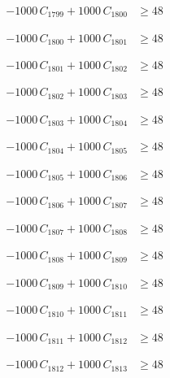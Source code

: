 \documentclass[a4paper,11pt]{article}
\begin{document}
\begin{align}
-1000\,C_{1799} + 1000\,C_{1800} &\geq 48 \nonumber
\end{align}

\begin{align}
-1000\,C_{1800} + 1000\,C_{1801} &\geq 48 \nonumber
\end{align}

\begin{align}
-1000\,C_{1801} + 1000\,C_{1802} &\geq 48 \nonumber
\end{align}

\begin{align}
-1000\,C_{1802} + 1000\,C_{1803} &\geq 48 \nonumber
\end{align}

\begin{align}
-1000\,C_{1803} + 1000\,C_{1804} &\geq 48 \nonumber
\end{align}

\begin{align}
-1000\,C_{1804} + 1000\,C_{1805} &\geq 48 \nonumber
\end{align}

\begin{align}
-1000\,C_{1805} + 1000\,C_{1806} &\geq 48 \nonumber
\end{align}

\begin{align}
-1000\,C_{1806} + 1000\,C_{1807} &\geq 48 \nonumber
\end{align}

\begin{align}
-1000\,C_{1807} + 1000\,C_{1808} &\geq 48 \nonumber
\end{align}

\begin{align}
-1000\,C_{1808} + 1000\,C_{1809} &\geq 48 \nonumber
\end{align}

\begin{align}
-1000\,C_{1809} + 1000\,C_{1810} &\geq 48 \nonumber
\end{align}

\begin{align}
-1000\,C_{1810} + 1000\,C_{1811} &\geq 48 \nonumber
\end{align}

\begin{align}
-1000\,C_{1811} + 1000\,C_{1812} &\geq 48 \nonumber
\end{align}

\begin{align}
-1000\,C_{1812} + 1000\,C_{1813} &\geq 48 \nonumber
\end{align}
\end{document}
